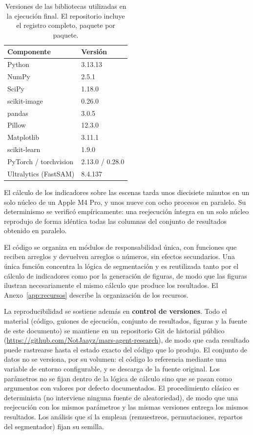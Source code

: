 \begin{table}[htbp]
  \centering
  \caption[Versiones de las bibliotecas utilizadas]{Versiones de las bibliotecas utilizadas en la
    ejecución final. El repositorio incluye el registro completo, paquete por paquete.}
  \label{tab:versiones}
  \begin{tabular}{ll}
    \toprule
    \textbf{Componente} & \textbf{Versión} \\
    \midrule
    Python        & 3.13.13 \\
    NumPy         & 2.5.1 \\
    SciPy         & 1.18.0 \\
    scikit-image  & 0.26.0 \\
    pandas        & 3.0.5 \\
    Pillow        & 12.3.0 \\
    Matplotlib    & 3.11.1 \\
    scikit-learn  & 1.9.0 \\
    PyTorch / torchvision & 2.13.0 / 0.28.0 \\
    Ultralytics (FastSAM) & 8.4.137 \\
    \bottomrule
  \end{tabular}
\end{table}

El cálculo de los indicadores sobre las \cNEscenas{} escenas tarda unos diecisiete minutos en
un solo núcleo de un Apple M4 Pro, y unos nueve con ocho procesos en paralelo. Su determinismo
se verificó empíricamente: una reejecución íntegra en un solo núcleo reprodujo de forma idéntica
todas las columnas del conjunto de resultados obtenido en paralelo.

El código se organiza en módulos de responsabilidad única, con funciones que reciben
arreglos y devuelven arreglos o números, sin efectos secundarios. Una única función
concentra la lógica de segmentación y es reutilizada tanto por el cálculo de indicadores
como por la generación de figuras, de modo que las figuras ilustran necesariamente el
mismo cálculo que produce los resultados. El Anexo~\ref{app:recursos} describe la
organización de los recursos.

La reproducibilidad se sostiene además en \textbf{control de versiones}. Todo el material
(código, guiones de ejecución, conjunto de resultados, figuras y la fuente de este
documento) se mantiene en un repositorio Git de historial público
(\url{https://github.com/NotJaayz/mars-agent-research}), de modo que cada
resultado puede rastrearse hasta el estado exacto del código que lo produjo. El conjunto de
datos no se versiona, por su volumen: el código lo referencia mediante una variable de
entorno configurable, y se descarga de la fuente original. Los parámetros no se fijan dentro
de la lógica de cálculo sino que se pasan como argumentos con valores por defecto
documentados. El procedimiento clásico es determinista (no interviene ninguna fuente de
aleatoriedad), de modo que una reejecución con los mismos parámetros y las mismas versiones
entrega los mismos resultados. Los análisis que sí la emplean (remuestreos, permutaciones,
repartos del segmentador) fijan su semilla.

